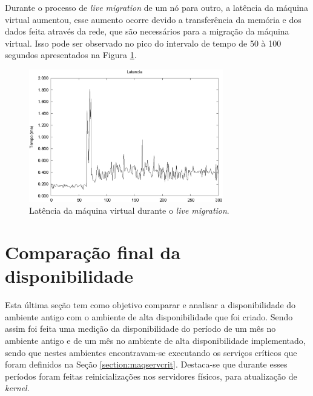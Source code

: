 Durante o processo de \textit{live migration} de um nó para outro, a latência da máquina virtual aumentou, esse aumento ocorre devido a 
transferência da memória e dos dados feita através da rede, que são necessários para a migração da máquina virtual. 
Isso pode ser observado no pico do intervalo de tempo de 50 à 100 segundos apresentados na Figura \ref{fig:teste2_latencia}.
\begin{figure}[h!]
 \centering
 \includegraphics[width=320px]{img/teste2_latencia.eps}
 \caption{Latência da máquina virtual durante o \textit{live migration}.}
 \label{fig:teste2_latencia}
\end{figure}



\section{Comparação final da disponibilidade}
\label{section:comparacaofinal}

Esta última seção tem como objetivo comparar e analisar a disponibilidade do ambiente antigo com o ambiente de alta disponibilidade que foi 
criado. Sendo assim foi feita uma medição da disponibilidade do período de um mês no ambiente antigo e de um mês no ambiente de alta 
disponibilidade implementado, sendo que nestes ambientes encontravam-se executando os serviços críticos que foram definidos na 
Seção \ref{section:maqservcrit}. Destaca-se que durante esses períodos foram feitas reinicializações nos servidores físicos, para atualização de
\textit{kernel}.

